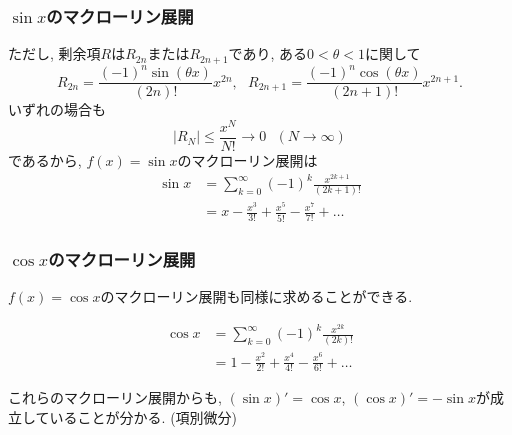 


\begin{frame}
\frametitle{$\sin x$のマクローリン展開}

ただし, 剰余項$R$は$R_{2n}$または$R_{2n+1}$であり, ある$0 < \theta <1$に関して
$$
R_{2n}=\frac{(-1)^n \sin(\theta x)}{(2n)!}x^{2n}, \ \ \ R_{2n+1}=\frac{(-1)^n \cos(\theta x)}{(2n+1)!}x^{2n+1}. 
$$
いずれの場合も
$$
|R_N| \le \frac{x^N}{N!} \to 0 \ \ \ (N \to \infty) 
$$
であるから, $f(x)=\sin x$のマクローリン展開は
\begin{align*}
\sin x & = \sum_{k=0}^{\infty}(-1)^k\frac{x^{2k+1}}{(2k+1)!} \\
& = x-\frac{x^3}{3!}+\frac{x^5}{5!}-\frac{x^7}{7!}+\dots 
\end{align*}

\end{frame}





\begin{frame}
\frametitle{$\cos x$のマクローリン展開}

$f(x)=\cos x$のマクローリン展開も同様に求めることができる. 

\begin{align*}
\cos x & = \sum_{k=0}^{\infty}(-1)^k\frac{x^{2k}}{(2k)!} \\
& = 1-\frac{x^2}{2!}+\frac{x^4}{4!}-\frac{x^6}{6!}+\dots 
\end{align*}

これらのマクローリン展開からも, $(\sin x)'=\cos x$, $(\cos x)' = -\sin x$が成立していることが分かる. (項別微分)

\end{frame}





